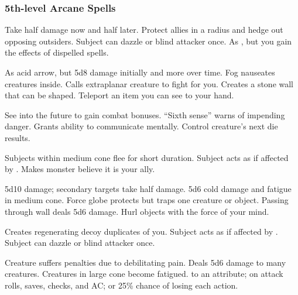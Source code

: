 \subsubsection{5th-level Arcane Spells} 
\begin{swspelllist}
   Take half damage now and half later. 
   Protect allies in a \areamed radius and hedge out opposing outsiders.
   Subject can dazzle or blind attacker once.
   As , but you gain the effects of dispelled spells.

   As acid arrow, but 5d8 damage initially and more over time.
   Fog nauseates creatures inside.
   Calls extraplanar creature to fight for you.
   Creates a stone wall that can be shaped.
   Teleport an item you can see to your hand.

   See into the future to gain combat bonuses.
   ``Sixth sense'' warns of impending danger.
   Grants ability to communicate mentally. 
   Control creature's next die results.

   Subjects within medium cone flee for short duration.
  \spellhead{}
   Subject acts as if affected by .
   Makes monster believe it is your ally.

   5d10 damage; secondary targets take half damage.
   5d6 cold damage and fatigue in medium cone.
   Force globe protects but traps one creature or object.
   Passing through wall deals 5d6 damage.
   Hurl objects with the force of your mind.

   Creates regenerating decoy duplicates of you.
   Subject acts as if affected by .
   Subject can dazzle or blind attacker once.
  \spellheadrestricted{}

   Creature suffers penalties due to debilitating pain.
   Deals 5d6 damage to many creatures.
   Creatures in large cone become fatigued.
    to an attribute;  on attack rolls, saves, checks, and AC; or 25\% chance of losing each action.


\end{swspelllist}
